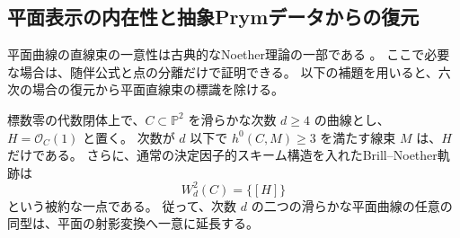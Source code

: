\subsection{平面表示の内在性と抽象Prymデータからの復元}
\label{subsec:abstract-prym-torelli-v27}

平面曲線の直線束の一意性は古典的なNoether理論の一部である
\cite{HartshorneNoether,CoppensKatoPlaneSystems}。
ここで必要な場合は、随伴公式と点の分離だけで証明できる。
以下の補題を用いると、六次の場合の復元から平面直線束の標識を除ける。

\begin{lemma}[平面直線束の一意性と剛性]
\label{lem:intrinsic-plane-series-v27}
標数零の代数閉体上で、$C\subset\mathbb P^2$ を滑らかな次数 $d\ge4$ の曲線とし、
$H=\mathcal O_C(1)$ と置く。
次数が $d$ 以下で $h^0(C,M)\ge3$ を満たす線束 $M$ は、$H$ だけである。
さらに、通常の決定因子的スキーム構造を入れたBrill--Noether軌跡は
\[
 W_d^2(C)=\{[H]\}
\]
という被約な一点である。
従って、次数 $d$ の二つの滑らかな平面曲線の任意の同型は、平面の射影変換へ一意に延長する。
\end{lemma}

